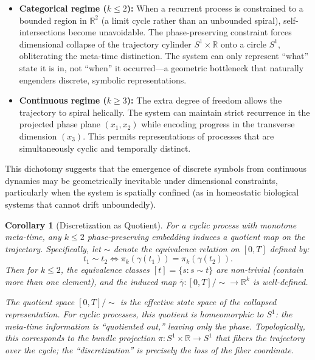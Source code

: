 \documentclass[12pt]{article}
\newtheorem{corollary}[theorem]{Corollary}
\newcommand{\R}{\mathbb{R}}
\begin{document}
\begin{itemize}
    \item \textbf{Categorical regime ($k \leq 2$):} When a recurrent process is constrained to a bounded region in $\R^2$ (a limit cycle rather than an unbounded spiral), self-intersections become unavoidable. The phase-preserving constraint forces dimensional collapse of the trajectory cylinder $S^1 \times \R$ onto a circle $S^1$, obliterating the meta-time distinction. The system can only represent ``what'' state it is in, not ``when'' it occurred---a geometric bottleneck that naturally engenders discrete, symbolic representations.

    \item \textbf{Continuous regime ($k \geq 3$):} The extra degree of freedom allows the trajectory to spiral helically. The system can maintain strict recurrence in the projected phase plane $(x_1, x_2)$ while encoding progress in the transverse dimension $(x_3)$. This permits representations of processes that are simultaneously cyclic and temporally distinct.
\end{itemize}

This dichotomy suggests that the emergence of discrete symbols from continuous dynamics may be geometrically inevitable under dimensional constraints, particularly when the system is spatially confined (as in homeostatic biological systems that cannot drift unboundedly).

\begin{corollary}[Discretization as Quotient]\label{cor:quotient}
For a cyclic process with monotone meta-time, any $k \leq 2$ phase-preserving embedding induces a quotient map on the trajectory. Specifically, let $\sim$ denote the equivalence relation on $[0,T]$ defined by:
\[
t_1 \sim t_2 \iff \pi_k(\gamma(t_1)) = \pi_k(\gamma(t_2)).
\]
Then for $k \leq 2$, the equivalence classes $[t] = \{s : s \sim t\}$ are non-trivial (contain more than one element), and the induced map $\bar{\gamma}: [0,T]/{\sim} \to \R^k$ is well-defined.

The quotient space $[0,T]/{\sim}$ is the \emph{effective state space} of the collapsed representation. For cyclic processes, this quotient is homeomorphic to $S^1$: the meta-time information is ``quotiented out,'' leaving only the phase. Topologically, this corresponds to the bundle projection $\pi: S^1 \times \R \to S^1$ that fibers the trajectory over the cycle; the ``discretization'' is precisely the loss of the fiber coordinate.
\end{corollary}
\end{document}
